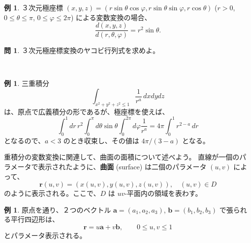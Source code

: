 \documentclass[a4paper]{jsarticle}
\theoremstyle{definition}
\newtheorem{Example}[Theorem]{例}
\newtheorem{Exercise}{問}%
\theoremstyle{remark}
\begin{document}
\begin{Example}
３次元極座標 $(x,y,z) = (r\sin\theta\cos\varphi, r\sin\theta\sin\varphi, r\cos\theta)$ 
($r>0$, $0 \leq \theta \leq \pi$, $0 \leq \varphi \leq 2\pi$) による変数変換の場合、
\[
\frac{d(x,y,z)}{d(r,\theta,\varphi)} 
= r^2 \sin \theta. 
\]
\end{Example}

\begin{Exercise}
３次元極座標変換のヤコビ行列式を求めよ。  
\end{Exercise}　

\begin{Example}
三重積分
\[ 
\int_{x^2+y^2+z^2 \leq 1} \frac{1}{r^a}\, dxdydz 
\] 
は、原点で広義積分の形であるが、極座標を使えば、
\[ 
\int_0^1dr\, r^2 \int_0^\pi d\theta \sin \theta \int_0^{2\pi} d\varphi \frac{1
}{r^a} 
= 4\pi \int_0^1 r^{2-a}\, dr 
\]
となるので、$a < 3$ のとき収束し、その値は $4\pi/(3-a)$ となる。
\end{Example} 



重積分の変数変換に関連して、曲面の面積について述べよう。
直線が一個のパラメータで表示されたように、\textbf{曲面} (surface) は二個のパラメータ $(u,v)$ によって、
\[
{\boldsymbol r}(u,v) = (x(u,v),y(u,v),z(u,v)), 
\quad 
(u,v) \in D
\]
のように表示される。ここで、$D$ は $uv$-平面内の領域を表わす。

\begin{Example}
原点を通り、２つのベクトル ${\boldsymbol a} = (a_1,a_2,a_3)$, 
${\boldsymbol b} = (b_1,b_2,b_3)$ で張られる平行四辺形は、
\[
{\boldsymbol r} = u{\boldsymbol a} + v{\boldsymbol b}, 
\qquad 
0 \leq u, v \leq 1
\]
とパラメータ表示される。
\end{Example}


\end{document}
